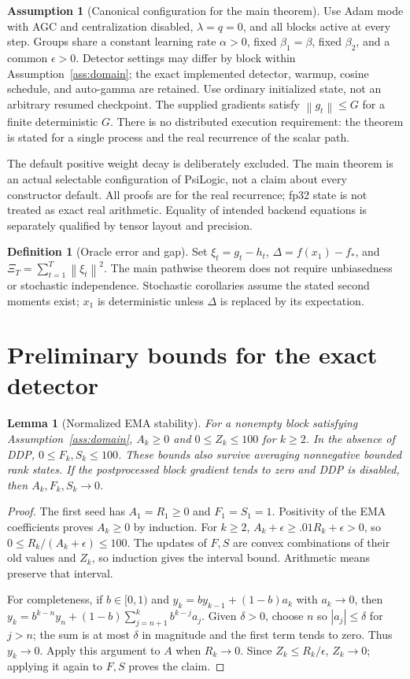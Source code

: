 \documentclass[11pt]{article}
\newtheorem{lemma}[theorem]{Lemma}
\theoremstyle{definition}
\newtheorem{definition}[theorem]{Definition}
\newtheorem{assumption}[theorem]{Assumption}
\theoremstyle{remark}
\newcommand{\norm}[1]{\left\lVert#1\right\rVert}
\begin{document}
\begin{assumption}[Canonical configuration for the main theorem]\label{ass:canonical}
Use Adam mode with AGC and centralization disabled, $\lambda=q=0$, and all
blocks active at every step. Groups share a constant learning rate $\alpha>0$,
fixed $\beta_1=\beta$, fixed $\beta_2$, and a common $\epsilon>0$. Detector
settings may differ by block within Assumption~\ref{ass:domain}; the exact
implemented detector, warmup, cosine schedule, and auto-gamma are retained.
Use ordinary initialized state, not an arbitrary resumed checkpoint. The
supplied gradients satisfy $\norm{g_t}\le G$ for a finite deterministic $G$.
There is no distributed execution requirement: the theorem is stated for a
single process and the real recurrence of the scalar path.
\end{assumption}
The default positive weight decay is deliberately excluded. The main theorem
is an actual selectable configuration of PsiLogic, not a claim about every
constructor default. All proofs are for the real recurrence; fp32 state is
not treated as exact real arithmetic. Equality of intended backend equations
is separately qualified by tensor layout and precision.

\begin{definition}[Oracle error and gap]
Set $\xi_t=g_t-h_t$, $\Delta=f(x_1)-f_*$, and
$\Xi_T=\sum_{t=1}^T\norm{\xi_t}^2$. The main pathwise theorem does not require
unbiasedness or stochastic independence. Stochastic corollaries assume the
stated second moments exist; $x_1$ is deterministic unless $\Delta$ is replaced
by its expectation.
\end{definition}

\section{Preliminary bounds for the exact detector}\label{sec:bounds}
\begin{lemma}[Normalized EMA stability]\label{lem:ema}
For a nonempty block satisfying Assumption~\ref{ass:domain}, $A_k\ge0$ and
$0\le Z_k\le100$ for $k\ge2$. In the absence of DDP, $0\le F_k,S_k\le100$.
These bounds also survive averaging nonnegative bounded rank states. If the
postprocessed block gradient tends to zero and DDP is disabled, then
$A_k,F_k,S_k\to0$.
\end{lemma}
\begin{proof}
The first seed has $A_1=R_1\ge0$ and $F_1=S_1=1$. Positivity of the EMA
coefficients proves $A_k\ge0$ by induction. For $k\ge2$,
$A_k+\epsilon\ge .01R_k+\epsilon>0$, so
$0\le R_k/(A_k+\epsilon)\le100$. The updates of $F,S$ are convex combinations
of their old values and $Z_k$, so induction gives the interval bound.
Arithmetic means preserve that interval.

For completeness, if $b\in[0,1)$ and $y_k=by_{k-1}+(1-b)a_k$ with
$a_k\to0$, then $y_k=b^{k-n}y_n+(1-b)\sum_{j=n+1}^k b^{k-j}a_j$.
Given $\delta>0$, choose $n$ so $|a_j|\le\delta$ for $j>n$; the sum is at
most $\delta$ in magnitude and the first term tends to zero. Thus $y_k\to0$.
Apply this argument to $A$ when $R_k\to0$. Since $Z_k\le R_k/\epsilon$,
$Z_k\to0$; applying it again to $F,S$ proves the claim.
\end{proof}
\end{document}
